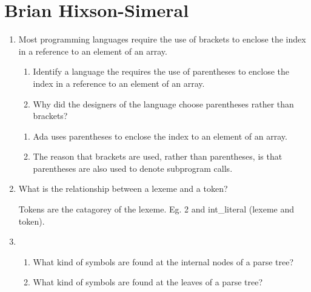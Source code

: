 
\chapter{Brian Hixson-Simeral}

\begin{enumerate}
  \item Most programming languages require the use of brackets to
    enclose the index in a reference to an element of an array.
  \begin{enumerate}
    \item Identify a language the requires the use of parentheses
      to enclose the index in a reference to an element of an array.
    \item Why did the designers of the language choose parentheses
      rather than brackets?
    \end{enumerate}

  \begin{answer}

  \begin{enumerate}
    \item Ada uses parentheses to enclose the index to an element of an array.
    \item The reason that brackets are used, rather than parentheses,
      is that parentheses are also used to denote subprogram calls.
    \end{enumerate}

    \end{answer}
    
  \item What is the relationship between a lexeme and a token?

  \begin{answer}

    Tokens are the catagorey of the lexeme.  Eg. 2 and int\_literal
    (lexeme and token).

    \end{answer}

  \item
  \begin{enumerate}
    \item What kind of symbols are found at the internal nodes of a
      parse tree?
    \item What kind of symbols are found at the leaves of a parse tree?
    \end{enumerate}

  \begin{answer}


\end{answer}
\end{enumerate}
